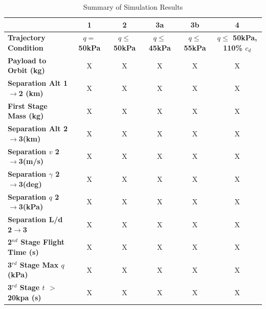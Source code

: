 \documentclass[]{aiaa-tc}
\newcommand{\FirstStageAltConstq}{X}
\newcommand{\FirstStageAltFifty}{X}
\newcommand{\FirstStageAltFortyFive}{X}
\newcommand{\FirstStageAltFiftyFive}{X}
\newcommand{\FirstStageAltHighDrag}{X}
\newcommand{\FirstStagemConstq}{X}
\newcommand{\FirstStagemFortyFive}{X}
\newcommand{\FirstStagemFifty}{X}
\newcommand{\FirstStagemFiftyFive}{X}
\newcommand{\FirstStagemHighDrag}{X}
\newcommand{\PayloadToOrbitConstq}{X}
\newcommand{\PayloadToOrbitFiftykPa}{X}
\newcommand{\PayloadToOrbitFortyFivekPa}{X}
\newcommand{\PayloadToOrbitFiftyFivekPa}{X}
\newcommand{\PayloadToOrbitHighDrag}{X}
\newcommand{\SeparationAltConstq}{X}
\newcommand{\SeparationAltFiftykPa}{X}
\newcommand{\SeparationAltFortyFivekPa}{X}
\newcommand{\SeparationAltFiftyFivekPa}{X}
\newcommand{\SeparationAltHighDrag}{X}
\newcommand{\SeparationvConstq}{X}
\newcommand{\SeparationvFiftykPa}{X}
\newcommand{\SeparationvFortyFivekPa}{X}
\newcommand{\SeparationvFiftyFivekPa}{X}
\newcommand{\SeparationvHighDrag}{X}
\newcommand{\SeparationAngleConstq}{X}
\newcommand{\SeparationAngleFiftykPa}{X}
\newcommand{\SeparationAngleFortyFivekPa}{X}
\newcommand{\SeparationAngleFiftyFivekPa}{X}
\newcommand{\SeparationAngleHighDrag}{X}
\newcommand{\SeparationqConstq}{X}
\newcommand{\SeparationqFiftykPa}{X}
\newcommand{\SeparationqFortyFivekPa}{X}
\newcommand{\SeparationqFiftyFivekPa}{X}
\newcommand{\SeparationqHighDrag}{X}
\newcommand{\SeparationLDConstq}{X}
\newcommand{\SeparationLDFiftykPa}{X}
\newcommand{\SeparationLDFortyFivekPa}{X}
\newcommand{\SeparationLDFiftyFivekPa}{X}
\newcommand{\SeparationLDHighDrag}{X}
\newcommand{\FlightTimeConstq}{X}
\newcommand{\FlightTimeFiftykPa}{X}
\newcommand{\FlightTimeFortyFivekPa}{X}
\newcommand{\FlightTimeFiftyFivekPa}{X}
\newcommand{\FlightTimeHighDrag}{X}
\newcommand{\MaxqConstq}{X}
\newcommand{\MaxqFiftykPa}{X}
\newcommand{\MaxqFortyFivekPa}{X}
\newcommand{\MaxqFiftyFivekPa}{X}
\newcommand{\MaxqHighDrag}{X}
\newcommand{\toverConstq}{X}
\newcommand{\toverFiftykPa}{X}
\newcommand{\toverFortyFivekPa}{X}
\newcommand{\toverFiftyFivekPa}{X}
\newcommand{\toverHighDrag}{X}
\begin{document}
\begin{table}[htb]
	\centering
	\caption{Summary of Simulation Results}
	\small
	\begin{tabular}{l c c c c c}
 & \textbf{1} & \textbf{2} & \textbf{3a} & \textbf{3b} & \textbf{4}  \\ 
 
		\hline \textbf{Trajectory Condition} & \textbf{$q = $ 50kPa} & \textbf{$q \leq $ 50kPa} & \textbf{ $q \leq $ 45kPa} & \textbf{$q \leq $ 55kPa} & \textbf{$q \leq $ 50kPa, 110\% $c_d$} \\ 
		\hline \textbf{Payload to Orbit (kg)}  & \PayloadToOrbitConstq & \PayloadToOrbitFiftykPa & \PayloadToOrbitFortyFivekPa & \PayloadToOrbitFiftyFivekPa & \PayloadToOrbitHighDrag \\ 
		\textbf{Separation Alt 1$\rightarrow$2 (km)}  & \FirstStageAltConstq & \FirstStageAltFifty & \FirstStageAltFortyFive &  \FirstStageAltFiftyFive &\FirstStageAltHighDrag \\ 
		\textbf{First Stage Mass (kg)} & \FirstStagemConstq & \FirstStagemFifty &  \FirstStagemFortyFive& \FirstStagemFiftyFive  & \FirstStagemHighDrag\\ 
		 \textbf{Separation Alt 2$\rightarrow$3(km)}  & \SeparationAltConstq & \SeparationAltFiftykPa & \SeparationAltFortyFivekPa & \SeparationAltFiftyFivekPa & \SeparationAltHighDrag\\ 
		 \textbf{Separation $v$ 2$\rightarrow$3(m/s)} & \SeparationvConstq  & \SeparationvFiftykPa & \SeparationvFortyFivekPa &  \SeparationvFiftyFivekPa & \SeparationvHighDrag\\ 
		 \textbf{Separation $\gamma$ 2$\rightarrow$3(deg)} & \SeparationAngleConstq& \SeparationAngleFiftykPa &\SeparationAngleFortyFivekPa& \SeparationAngleFiftyFivekPa&\SeparationAngleHighDrag \\ 
		 \textbf{Separation $q$ 2$\rightarrow$3(kPa)} & \SeparationqConstq  &\SeparationqFiftykPa&\SeparationqFortyFivekPa &\SeparationqFiftyFivekPa& \SeparationqHighDrag \\ 
		 \textbf{Separation L/d 2$\rightarrow$3} & \SeparationLDConstq&\SeparationLDFiftykPa & \SeparationLDFortyFivekPa & \SeparationLDFiftyFivekPa &\SeparationLDHighDrag\\
		 \textbf{2$^{nd}$ Stage Flight Time (s)} & \FlightTimeConstq & \FlightTimeFiftykPa & \FlightTimeFortyFivekPa & \FlightTimeFiftyFivekPa & \FlightTimeHighDrag\\ 
		 \textbf{3$^{rd}$ Stage Max $q$ (kPa)} &\MaxqConstq  &\MaxqFiftykPa & \MaxqFortyFivekPa &\MaxqFiftyFivekPa & \MaxqHighDrag\\ 
		 \textbf{3$^{rd}$ Stage $t$ $>$ 20kpa (s)} &\toverConstq &\toverFiftykPa &\toverFortyFivekPa &\toverFiftyFivekPa & \toverHighDrag\\ 
		 
		 
		\hline 
	\end{tabular} 


	\label{table:Summary}
\end{table}
\end{document}
